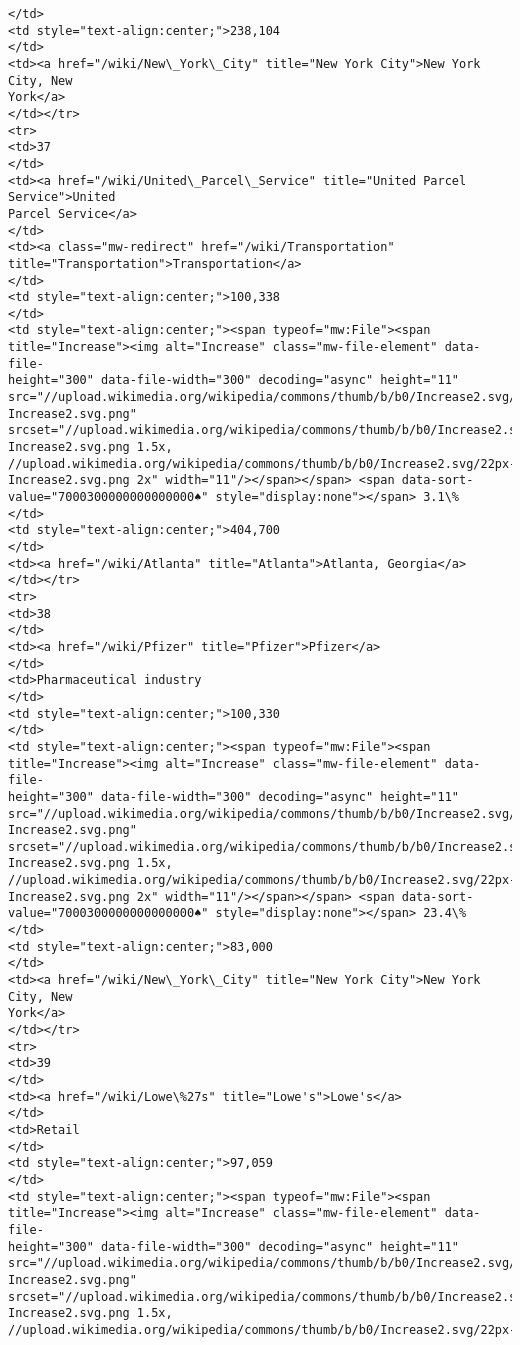 \documentclass[11pt]{article}
\begin{document}
\begin{Verbatim}[commandchars=\\\{\}]
</td>
<td style="text-align:center;">238,104
</td>
<td><a href="/wiki/New\_York\_City" title="New York City">New York City, New
York</a>
</td></tr>
<tr>
<td>37
</td>
<td><a href="/wiki/United\_Parcel\_Service" title="United Parcel Service">United
Parcel Service</a>
</td>
<td><a class="mw-redirect" href="/wiki/Transportation"
title="Transportation">Transportation</a>
</td>
<td style="text-align:center;">100,338
</td>
<td style="text-align:center;"><span typeof="mw:File"><span
title="Increase"><img alt="Increase" class="mw-file-element" data-file-
height="300" data-file-width="300" decoding="async" height="11"
src="//upload.wikimedia.org/wikipedia/commons/thumb/b/b0/Increase2.svg/11px-
Increase2.svg.png"
srcset="//upload.wikimedia.org/wikipedia/commons/thumb/b/b0/Increase2.svg/17px-
Increase2.svg.png 1.5x,
//upload.wikimedia.org/wikipedia/commons/thumb/b/b0/Increase2.svg/22px-
Increase2.svg.png 2x" width="11"/></span></span> <span data-sort-
value="7000300000000000000♠" style="display:none"></span> 3.1\%
</td>
<td style="text-align:center;">404,700
</td>
<td><a href="/wiki/Atlanta" title="Atlanta">Atlanta, Georgia</a>
</td></tr>
<tr>
<td>38
</td>
<td><a href="/wiki/Pfizer" title="Pfizer">Pfizer</a>
</td>
<td>Pharmaceutical industry
</td>
<td style="text-align:center;">100,330
</td>
<td style="text-align:center;"><span typeof="mw:File"><span
title="Increase"><img alt="Increase" class="mw-file-element" data-file-
height="300" data-file-width="300" decoding="async" height="11"
src="//upload.wikimedia.org/wikipedia/commons/thumb/b/b0/Increase2.svg/11px-
Increase2.svg.png"
srcset="//upload.wikimedia.org/wikipedia/commons/thumb/b/b0/Increase2.svg/17px-
Increase2.svg.png 1.5x,
//upload.wikimedia.org/wikipedia/commons/thumb/b/b0/Increase2.svg/22px-
Increase2.svg.png 2x" width="11"/></span></span> <span data-sort-
value="7000300000000000000♠" style="display:none"></span> 23.4\%
</td>
<td style="text-align:center;">83,000
</td>
<td><a href="/wiki/New\_York\_City" title="New York City">New York City, New
York</a>
</td></tr>
<tr>
<td>39
</td>
<td><a href="/wiki/Lowe\%27s" title="Lowe's">Lowe's</a>
</td>
<td>Retail
</td>
<td style="text-align:center;">97,059
</td>
<td style="text-align:center;"><span typeof="mw:File"><span
title="Increase"><img alt="Increase" class="mw-file-element" data-file-
height="300" data-file-width="300" decoding="async" height="11"
src="//upload.wikimedia.org/wikipedia/commons/thumb/b/b0/Increase2.svg/11px-
Increase2.svg.png"
srcset="//upload.wikimedia.org/wikipedia/commons/thumb/b/b0/Increase2.svg/17px-
Increase2.svg.png 1.5x,
//upload.wikimedia.org/wikipedia/commons/thumb/b/b0/Increase2.svg/22px-

\end{Verbatim}
\end{document}
